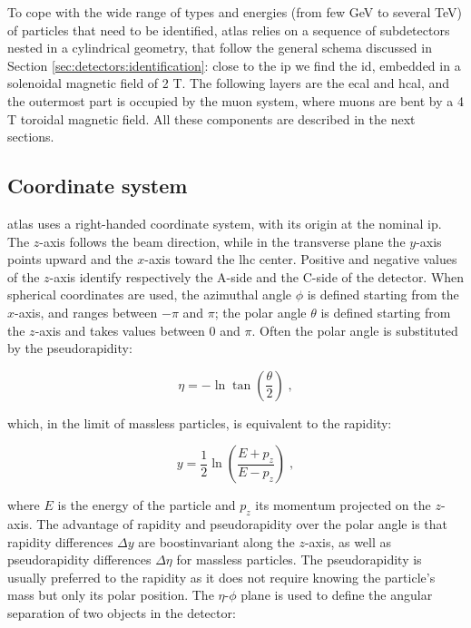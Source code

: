 To cope with the wide range of types and energies (from few GeV to several TeV) of particles that need to be identified, \gls{atlas} relies on a sequence of subdetectors nested in a cylindrical geometry, that follow the general schema discussed in Section \ref{sec:detectors:identification}: close to the \gls{ip} we find the \gls{id}, embedded in a solenoidal magnetic field of 2 T. The following layers are the \gls{ecal} and \gls{hcal}, and the outermost part is occupied by the muon system, where muons are bent by a 4 T toroidal magnetic field. All these components are described in the next sections.

\subsection{Coordinate system}

\gls{atlas} uses a right-handed coordinate system, with its origin at the nominal \gls{ip}. The $z$-axis follows the beam direction, while in the transverse plane the $y$-axis points upward and the $x$-axis toward the \gls{lhc} center. Positive and negative values of the $z$-axis identify respectively the A-side and the C-side of the detector. When spherical coordinates are used, the azimuthal angle $\phi$ is defined starting from the $x$-axis, and ranges between $-\pi$ and $\pi$; the polar angle $\theta$ is defined starting from the $z$-axis and takes values between $0$ and $\pi$. Often the polar angle is substituted by the pseudorapidity: 
 
\begin{equation}
\eta = - \ln\tan\left(\frac{\theta}{2}\right) \; , \nonumber
\label{eq:cern:eta}
\end{equation}

\noindent which, in the limit of massless particles, is equivalent to the rapidity:

\begin{equation}
y = \frac{1}{2} \ln\left(\frac{E + p_z}{E - p_z}\right) \; , \nonumber
\label{eq:cern:y}
\end{equation}

\noindent where $E$ is the energy of the particle and $p_z$ its momentum projected on the $z$-axis. 
The advantage of rapidity and pseudorapidity over the polar angle is that rapidity differences $\Delta y$ are boostinvariant
along the $z$-axis, as well as pseudorapidity differences $\Delta \eta$ for massless particles.
The pseudorapidity is usually preferred to the rapidity as it does not require
knowing the particle’s mass but only its polar position.
The $\eta$-$\phi$ plane is used to define the angular separation of two objects in the detector:

